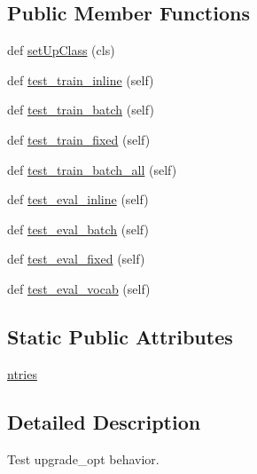 \subsection*{Public Member Functions}
\begin{DoxyCompactItemize}
\item 
def \hyperlink{classtests_1_1test__tra_1_1__AbstractTRATest_ade44250f8726cfdc9e77fa23b18bfb01}{set\+Up\+Class} (cls)
\item 
def \hyperlink{classtests_1_1test__tra_1_1__AbstractTRATest_a8f1fa4ff06f7fd52c1639655561fe7ee}{test\+\_\+train\+\_\+inline} (self)
\item 
def \hyperlink{classtests_1_1test__tra_1_1__AbstractTRATest_a00c2874cb33f155fa829cc7783d5d724}{test\+\_\+train\+\_\+batch} (self)
\item 
def \hyperlink{classtests_1_1test__tra_1_1__AbstractTRATest_a30a5312eaf7639e762ddbd410e31332c}{test\+\_\+train\+\_\+fixed} (self)
\item 
def \hyperlink{classtests_1_1test__tra_1_1__AbstractTRATest_a5e0358ae47540ed9b0583e75ac1d9a49}{test\+\_\+train\+\_\+batch\+\_\+all} (self)
\item 
def \hyperlink{classtests_1_1test__tra_1_1__AbstractTRATest_af0ce31577227b0572fb440881dd48be0}{test\+\_\+eval\+\_\+inline} (self)
\item 
def \hyperlink{classtests_1_1test__tra_1_1__AbstractTRATest_a4ba4e6e2822503780f927c9916e3ae55}{test\+\_\+eval\+\_\+batch} (self)
\item 
def \hyperlink{classtests_1_1test__tra_1_1__AbstractTRATest_a34bce944e4e602830f52995c2b42ac81}{test\+\_\+eval\+\_\+fixed} (self)
\item 
def \hyperlink{classtests_1_1test__tra_1_1__AbstractTRATest_a4576c8054384ac195a275851d2cd3e4f}{test\+\_\+eval\+\_\+vocab} (self)
\end{DoxyCompactItemize}
\subsection*{Static Public Attributes}
\begin{DoxyCompactItemize}
\item 
\hyperlink{classtests_1_1test__tra_1_1__AbstractTRATest_ad32ac0cefbe9f77b0b1541085cf5365a}{ntries}
\end{DoxyCompactItemize}


\subsection{Detailed Description}
\begin{DoxyVerb}Test upgrade_opt behavior.\end{DoxyVerb}
 

